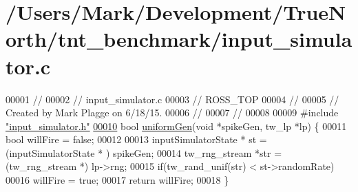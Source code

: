 \hypertarget{input__simulator_8c_source}{}\section{/\+Users/\+Mark/\+Development/\+True\+North/tnt\+\_\+benchmark/input\+\_\+simulator.c}

\begin{DoxyCode}
00001 \textcolor{comment}{//}
00002 \textcolor{comment}{//  input\_simulator.c}
00003 \textcolor{comment}{//  ROSS\_TOP}
00004 \textcolor{comment}{//}
00005 \textcolor{comment}{//  Created by Mark Plagge on 6/18/15.}
00006 \textcolor{comment}{//}
00007 \textcolor{comment}{//}
00008 
00009 \textcolor{preprocessor}{#}\textcolor{preprocessor}{include} \hyperlink{input__simulator_8h}{"input\_simulator.h"}
\hypertarget{input__simulator_8c_source_l00010}{}\hyperlink{input__simulator_8h_ad6244e86a3542f8d3c64766e7e7c6746}{00010} \textcolor{keywordtype}{bool} \hyperlink{input__simulator_8h_ad6244e86a3542f8d3c64766e7e7c6746}{uniformGen}(\textcolor{keywordtype}{void} *spikeGen, tw\_lp *lp) \{
00011     \textcolor{keywordtype}{bool} willFire = \textcolor{keyword}{false};
00012 
00013     inputSimulatorState * st = (inputSimulatorState * ) spikeGen;
00014     tw\_rng\_stream *str = (tw\_rng\_stream *) lp->rng;
00015     \textcolor{keywordflow}{if}(tw\_rand\_unif(str) < st->randomRate)
00016         willFire = \textcolor{keyword}{true};
00017     \textcolor{keywordflow}{return} willFire;
00018 \}
\end{DoxyCode}

